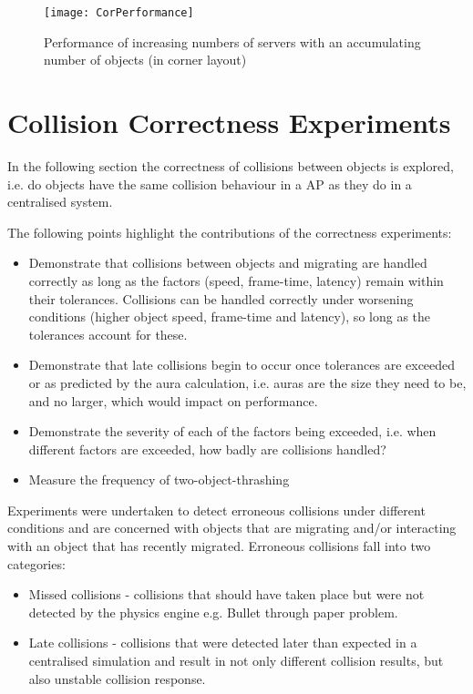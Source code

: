 \begin{figure}[!t]
	\centering
	\texttt{[image: CorPerformance]}
	\caption{Performance of increasing numbers of servers with an accumulating number of objects (in corner layout)}
	\label{fig_PerCor}
\end{figure}

\section{Collision Correctness Experiments}
In the following section the correctness of collisions between objects is explored, i.e. do objects have the same collision behaviour in a AP as they do in a centralised system.

The following points highlight the contributions of the correctness experiments:
\begin{itemize}
	\item Demonstrate that collisions between objects and migrating are handled correctly as long as the factors (speed, frame-time, latency) remain within their tolerances. Collisions can be handled correctly under worsening conditions (higher object speed, frame-time and latency), so long as the tolerances account for these.
	\item Demonstrate that late collisions begin to occur once tolerances are exceeded or as predicted by the aura calculation, i.e. auras are the size they need to be, and no larger, which would impact on performance.
	\item Demonstrate the severity of each of the factors being exceeded, i.e. when different factors are exceeded, how badly are collisions handled?
	\item Measure the frequency of two-object-thrashing
\end{itemize}

Experiments were undertaken to detect erroneous collisions under different conditions and are concerned with objects that are migrating and/or interacting with an object that has recently migrated. Erroneous collisions fall into two categories:
\begin{itemize}
	\item Missed collisions - collisions that should have taken place but were not detected by the physics engine e.g. Bullet through paper problem.
	\item Late collisions - collisions that were detected later than expected in a centralised simulation and result in not only different collision results, but also unstable collision response.
\end{itemize}

